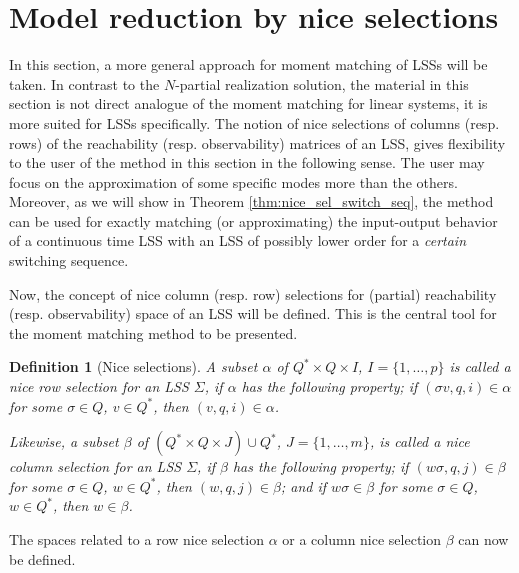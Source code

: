 \documentclass[journal]{IEEEtran}
\newtheorem{Definition}{Definition}
\begin{document}
\section{Model reduction by nice selections}
\label{sect:nice}

In this section, a more general approach for moment matching of LSSs will be taken. In contrast to the $N$-partial realization solution, the material in this section is not direct analogue of the moment matching for linear systems, it is more suited for LSSs specifically. The notion of nice selections of columns (resp. rows) of the reachability (resp. observability) matrices of an LSS, gives flexibility to the user of the method in this section in the following sense. The user may focus on the approximation of some specific modes more than the others. Moreover, as we will show in Theorem \ref{thm:nice_sel_switch_seq}, the method can be used for exactly matching (or approximating) the input-output behavior of a continuous time LSS with an LSS of possibly lower order for a \emph{certain} switching sequence.


Now, the concept of nice column (resp. row) selections for (partial) reachability (resp. observability) space of an LSS will be defined. This is the central tool for the moment matching method to be presented. 

\begin{Definition}[Nice selections]
	A subset $\alpha$ of $Q^* \times Q \times I$, $I=\{1, \dots, p\}$ is called a nice row selection for an LSS $\Sigma$, if $\alpha$ has the following property; if $(\sigma v, q, i) \in \alpha$ for some $\sigma \in Q$, $v \in Q^*$, then $(v,q,i) \in \alpha$.
	
	Likewise, a subset $\beta$ of $(Q^* \times Q \times J) \cup Q^*$, $J=\{1, \dots, m\}$, is called a nice column selection for an LSS  $\Sigma$, if $\beta$ has the following property; if $(w \sigma, q, j) \in \beta$ for some $\sigma \in Q$, $w \in Q^*$, then $(w,q,j) \in \beta$; and if $w \sigma \in \beta$ for some $\sigma \in Q$, $w \in Q^*$, then $w \in \beta$.
\end{Definition}

The spaces related to a row nice selection $\alpha$ or a column nice selection $\beta$ can now be defined.
 
\end{document}
